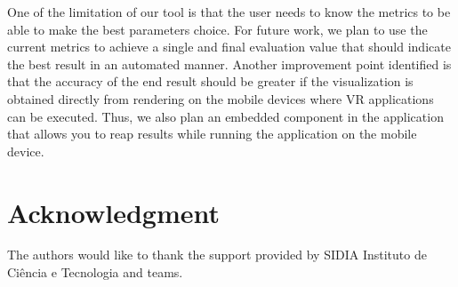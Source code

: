 \documentclass[10pt,conference]{IEEEtran}
\begin{document}
One of the limitation of our tool is that the user needs to know the metrics to be able to make the best parameters choice. For future work, we plan to use the current metrics to achieve a single and final evaluation value that should indicate the best result in an automated manner. Another improvement point identified is that the accuracy of the end result should be greater if the visualization is obtained directly from rendering on the mobile devices where VR applications can be executed. Thus, we also plan an embedded component in the application that allows you to reap results while running the application on the mobile device.


\section*{Acknowledgment}
The authors would like to thank the support provided by SIDIA Instituto de Ciência e Tecnologia and teams.


















%
%


\end{document}
